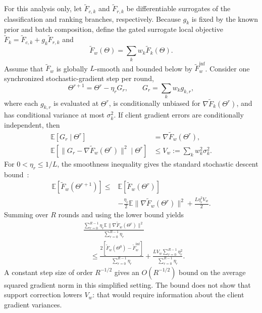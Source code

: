 \documentclass[lettersize,journal]{IEEEtran}
\begin{document}
For this analysis only, let $\widetilde F_{c,k}$ and $\widetilde F_{r,k}$ be differentiable surrogates of the classification and ranking branches, respectively. Because $g_k$ is fixed by the known prior and batch composition, define the gated surrogate local objective $\widetilde F_k=\widetilde F_{c,k}+g_k\widetilde F_{r,k}$ and
\begin{equation}
\widetilde F_w(\Theta)=\sum_k w_k\widetilde F_k(\Theta).
\label{eq:weighted-global-objective}
\end{equation}
Assume that $\widetilde F_w$ is globally $L$-smooth and bounded below by $\widetilde F_w^{\inf}$. Consider one synchronized stochastic-gradient step per round,
\begin{equation}
\Theta^{r+1}=\Theta^r-\eta_rG_r,\qquad
G_r=\sum_k w_kg_{k,r},
\label{eq:ideal-update}
\end{equation}
where each $g_{k,r}$ is evaluated at $\Theta^r$, is conditionally unbiased for $\nabla\widetilde F_k(\Theta^r)$, and has conditional variance at most $\sigma_k^2$. If client gradient errors are conditionally independent, then
\begin{equation}
\begin{aligned}
\mathbb E[G_r\mid\Theta^r]&=\nabla\widetilde F_w(\Theta^r),\\
\mathbb E[\|G_r-\nabla\widetilde F_w(\Theta^r)\|^2\mid\Theta^r]
&\leq V_w:=\sum_k w_k^2\sigma_k^2.
\end{aligned}
\label{eq:local-assumptions}
\end{equation}
For $0<\eta_r\leq1/L$, the smoothness inequality gives the standard stochastic descent bound~\cite{ref_sgd_analysis}:
\begin{equation}
\begin{aligned}
\mathbb E[\widetilde F_w(\Theta^{r+1})]
\leq{}&\mathbb E[\widetilde F_w(\Theta^r)]\\
&-\frac{\eta_r}{2}\mathbb E\|\nabla\widetilde F_w(\Theta^r)\|^2
+\frac{L\eta_r^2V_w}{2}.
\end{aligned}
\label{eq:local-convergence}
\end{equation}
Summing over $R$ rounds and using the lower bound yields
\begin{equation}
\begin{aligned}
&\frac{\sum_{r=0}^{R-1}\eta_r\mathbb E\|\nabla\widetilde F_w(\Theta^r)\|^2}
{\sum_{r=0}^{R-1}\eta_r}
\\
&\quad\leq\frac{2[\widetilde F_w(\Theta^0)-\widetilde F_w^{\inf}]}
{\sum_{r=0}^{R-1}\eta_r}
+\frac{LV_w\sum_{r=0}^{R-1}\eta_r^2}
{\sum_{r=0}^{R-1}\eta_r}.
\end{aligned}
\label{eq:global-convergence}
\end{equation}
A constant step size of order $R^{-1/2}$ gives an $O(R^{-1/2})$ bound on the average squared gradient norm in this simplified setting. The bound does not show that support correction lowers $V_w$: that would require information about the client gradient variances.
\end{document}

